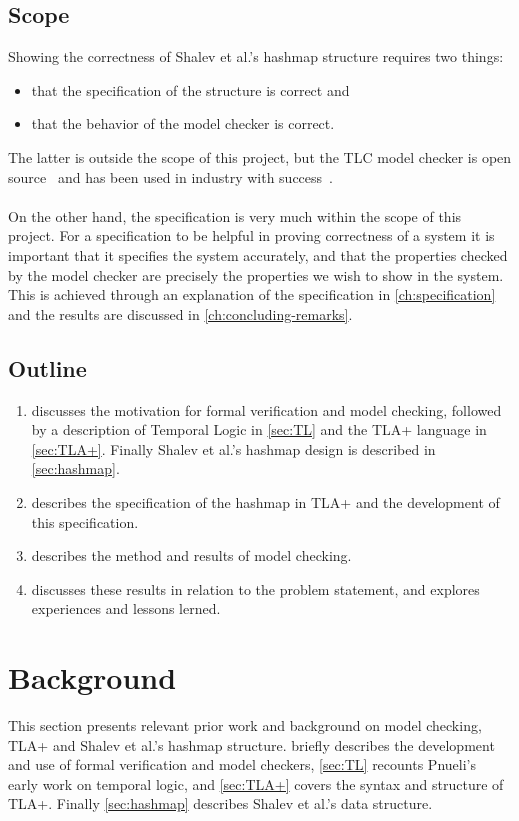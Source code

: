 \documentclass{uit-thesis}
\begin{document}
\section{Scope}
Showing the correctness of Shalev et al.'s hashmap structure requires two things:
\begin{itemize}[label={}]
    \item that the specification of the structure is correct and
    \item that the behavior of the model checker is correct.
\end{itemize}
The latter is outside the scope of this project, but the TLC model checker is open source~\cite{TLAplus} and has been used in industry with success~\cite{Amazon2015, Lamport-Batson2002}.\\\\
On the other hand, the specification is very much within the scope of this project. For a specification to be helpful in proving correctness of a system it is important that it specifies the system accurately, and that the properties checked by the model checker are precisely the properties we wish to show in the system. This is achieved through an explanation of the specification in \autoref{ch:specification} and the results are discussed in \autoref{ch:concluding-remarks}.

\section{Outline}
\begin{enumerate}[label={}]
    \item \textbf{} discusses the motivation for formal verification and model checking, followed by a description of Temporal Logic in \autoref{sec:TL} and the TLA+ language in \autoref{sec:TLA+}. Finally Shalev et al.'s hashmap design is described in \autoref{sec:hashmap}.
    \item \textbf{} describes the specification of the hashmap in TLA+ and the development of this specification.
    \item \textbf{} describes the method and results of model checking.
    \item \textbf{} discusses these results in relation to the problem statement, and explores experiences and lessons lerned.
\end{enumerate}


\chapter{Background}\label{ch:background}
This section presents relevant prior work and background on model checking, TLA+ and Shalev et al.'s hashmap structure.  briefly describes the development and use of formal verification and model checkers, \autoref{sec:TL} recounts Pnueli's~\cite{Pnueli1977} early work on temporal logic, and \autoref{sec:TLA+} covers the syntax and structure of TLA+. Finally \autoref{sec:hashmap} describes Shalev et al.'s data structure.
\end{document}
